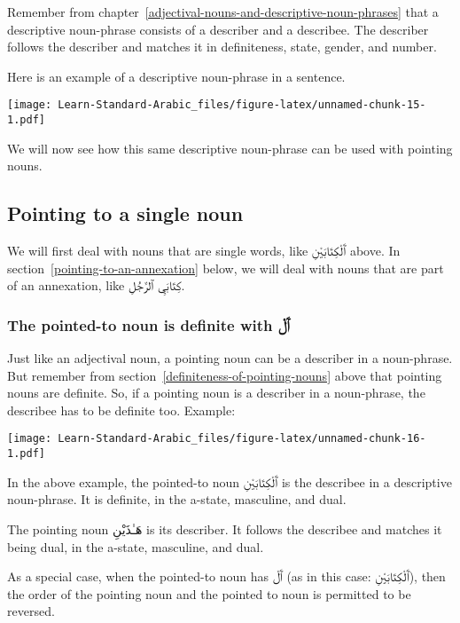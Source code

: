 \documentclass[
  10pt,
]{book}
\begin{document}
Remember from chapter~\ref{adjectival-nouns-and-descriptive-noun-phrases} that a descriptive noun-phrase consists of a describer and a describee. The describer follows the describer and matches it in definiteness, state, gender, and number.

Here is an example of a descriptive noun-phrase in a sentence.

\texttt{[image: Learn-Standard-Arabic\_files/figure-latex/unnamed-chunk-15-1.pdf]}

We will now see how this same descriptive noun-phrase can be used with pointing nouns.

\subsection{Pointing to a single noun}\label{pointing-to-a-single-noun}

We will first deal with nouns that are single words, like \foreignlanguage{arabic}{ٱَلْکِتَابَيْنِ} above.
In section~\ref{pointing-to-an-annexation}
below, we will deal with nouns that are part of an annexation, like \foreignlanguage{arabic}{کِتَابَيِ ٱلرَّجُلِ}.

\subsubsection{\texorpdfstring{The pointed-to noun is definite with \foreignlanguage{arabic}{ٱَلْ}}{The pointed-to noun is definite with ٱَلْ}}\label{phrase-single-pointed-to-noun-with-al}

Just like an adjectival noun, a pointing noun can be a describer in a noun-phrase. But remember from
section~\ref{definiteness-of-pointing-nouns}
above that pointing nouns are definite.
So, if a pointing noun is a describer in a noun-phrase, the describee has to be definite too.
Example:

\texttt{[image: Learn-Standard-Arabic\_files/figure-latex/unnamed-chunk-16-1.pdf]}

In the above example, the pointed-to noun \foreignlanguage{arabic}{ٱَلْکِتَابَيْنِ} is the describee in a descriptive noun-phrase. It is definite, in the a-state, masculine, and dual.

The pointing noun \foreignlanguage{arabic}{هَـٰذَيْنِ} is its describer. It follows the describee and matches it being dual, in the a-state, masculine, and dual.

As a special case, when the pointed-to noun has \foreignlanguage{arabic}{ٱَلْ} (as in this case: \foreignlanguage{arabic}{ٱَلْکِتَابَيْنِ}), then the order of the pointing noun and the pointed to noun is permitted to be reversed.
\end{document}
